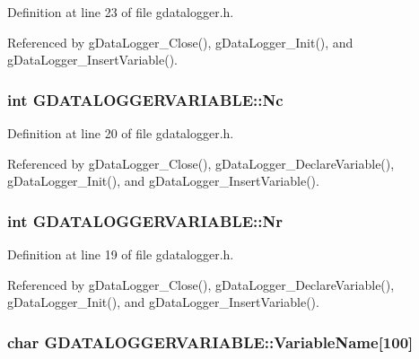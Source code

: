 Definition at line 23 of file gdatalogger.h.



Referenced by gDataLogger\_\-Close(), gDataLogger\_\-Init(), and gDataLogger\_\-InsertVariable().

\hypertarget{structGDATALOGGERVARIABLE_abd1db7599f09e121cd125e665cb9c460}{
\subsubsection[{Nc}]{\setlength{\rightskip}{0pt plus 5cm}int {\bf GDATALOGGERVARIABLE::Nc}}}
\label{structGDATALOGGERVARIABLE_abd1db7599f09e121cd125e665cb9c460}


Definition at line 20 of file gdatalogger.h.



Referenced by gDataLogger\_\-Close(), gDataLogger\_\-DeclareVariable(), gDataLogger\_\-Init(), and gDataLogger\_\-InsertVariable().

\hypertarget{structGDATALOGGERVARIABLE_a68c3eb0f57a786afe9a2658fc42b61d6}{
\subsubsection[{Nr}]{\setlength{\rightskip}{0pt plus 5cm}int {\bf GDATALOGGERVARIABLE::Nr}}}
\label{structGDATALOGGERVARIABLE_a68c3eb0f57a786afe9a2658fc42b61d6}


Definition at line 19 of file gdatalogger.h.



Referenced by gDataLogger\_\-Close(), gDataLogger\_\-DeclareVariable(), gDataLogger\_\-Init(), and gDataLogger\_\-InsertVariable().

\hypertarget{structGDATALOGGERVARIABLE_a336b7b6cbfc9cdebc7e1ade3de17ac3f}{
\subsubsection[{VariableName}]{\setlength{\rightskip}{0pt plus 5cm}char {\bf GDATALOGGERVARIABLE::VariableName}\mbox{[}100\mbox{]}}}
\label{structGDATALOGGERVARIABLE_a336b7b6cbfc9cdebc7e1ade3de17ac3f}


